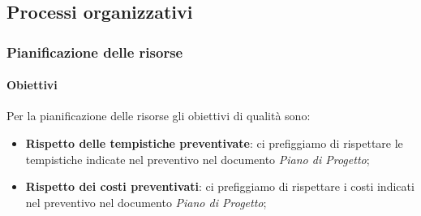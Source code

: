      \subsection{Processi organizzativi}
		\subsubsection{Pianificazione delle risorse}
			\paragraph{Obiettivi}
			Per la pianificazione delle risorse gli obiettivi di qualità sono:
			\begin{itemize}
				\item \textbf{Rispetto delle tempistiche preventivate}: ci prefiggiamo di rispettare le tempistiche indicate nel preventivo nel documento \textit{Piano di Progetto};
				\item \textbf{Rispetto dei costi preventivati}: ci prefiggiamo di rispettare i costi indicati nel preventivo nel documento \textit{Piano di Progetto};
			\end{itemize}	
